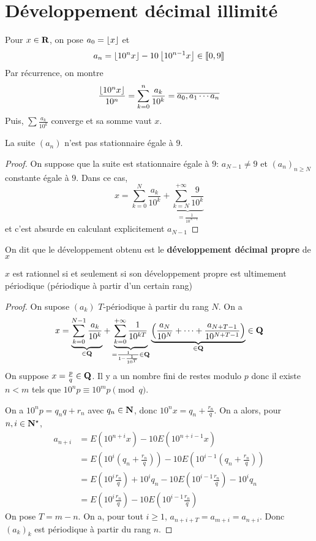 \section{Développement décimal illimité}

Pour $x\in\mathbf R$, on pose $a_0=\left\lfloor x\right\rfloor$ et \[
    a_n=\left\lfloor10^nx\right\rfloor-10\left\lfloor10^{n-1}x\right\rfloor\in\llbracket 0,9\rrbracket
\]
Par récurrence, on montre \[
    \frac{\left\lfloor10^nx\right\rfloor}{10^n}=\sum_{k=0}^n\frac{a_k}{10^k}=\overline{a_0,a_1\cdots a_n}
\]
Puis, $\sum \frac{a_k}{10^k}$ converge et sa somme vaut $x$.

\begin{rem}
    La suite $(a_n)$ n'est pas stationnaire égale à $9$.
\end{rem}

\begin{proof}
    On suppose que la suite est stationnaire égale à $9$: $a_{N-1}\neq 9$ et $(a_n)_{n\geq N}$ constante égale à $9$. Dans ce cas, \[
        x=\sum_{k=0}^N\frac{a_k}{10^k}+\underbrace{\sum_{k=N}^{+\infty}\frac9{10^k}}_{=\frac1{10^{N-1}}}
    \]
    et c'est absurde en calculant explicitement $a_{N-1}$
\end{proof}

On dit que le développement obtenu est le \textbf{développement décimal propre} de $x$ 

\begin{prop}
    $x$ est rationnel si et seulement si son développement propre est ultimement périodique (périodique à partir d'un certain rang)
\end{prop}

\begin{proof}
    On supose $(a_k)$ $T$-périodique à partir du rang $N$. On a \[
        x=\underbrace{\sum_{k=0}^{N-1}\frac{a_k}{10^k}}_{\in\mathbf Q}+\underbrace{\sum_{k=0}^{+\infty}\frac1{10^{kT}}}_{=\frac1{1-\frac1{10^T}}\in\mathbf Q} \underbrace{\left(  \frac{a_N}{10^N}+\cdots +\frac{a_{N+T-1}}{10^{N+T-1}}\right)}_{\in \mathbf Q}\in\mathbf Q
    \]
    On suppose $x=\frac pq\in\mathbf Q$. Il y a un nombre fini de restes modulo $p$ donc il existe $n<m$ tels que $10^np\equiv 10^mp\pmod q$.

On a $10^np=q_nq+r_n$ avec $q_n\in\mathbf N$, donc $10^nx=q_n+\frac{r_n}q$. On a alors, pour $n, i\in\mathbf N^\star$, \begin{align*}
                a_{n+i} &= E(10^{n+i}x)-10E(10^{n+i-1}x) \\
                        &= E\left(10^i \left( q_n+\frac{r_n}q \right)\right)-10E \left( 10^{i-1} \left(  q_n+\frac{r_n}q \right) \right) \\
                        &= E \left( 10^i\frac {r_n}q \right)+10^iq_n-10E \left( 10^{i-1}\frac {r_n}q \right) -10^iq_n \\
                        &= E \left( 10^i\frac {r_n}q \right) - 10E \left( 10^{i-1}\frac {r_n}q \right)
            \end{align*}
         On pose $T=m-n$. On a, pour tout $i\geq 1$, $a_{n+i+T}=a_{m+i}=a_{n+i}$. Donc $(a_k)_k$ est périodique à partir du rang $n$.
\end{proof}

\endchapter
